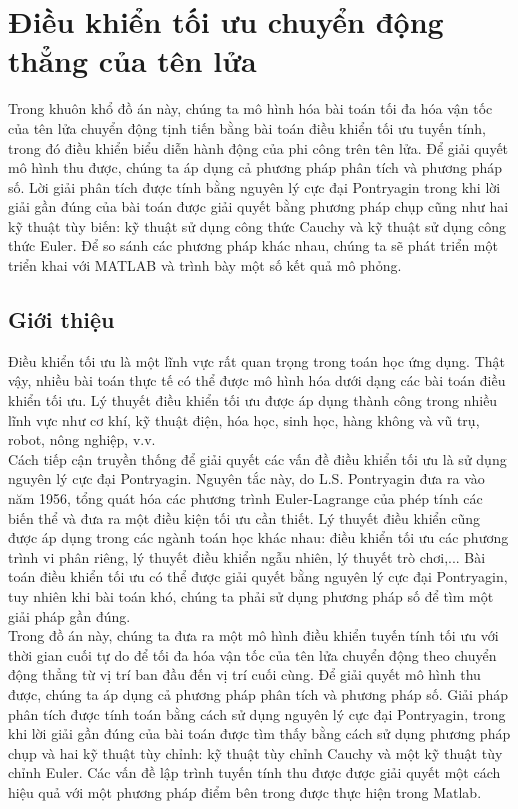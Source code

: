\documentclass[12pt,a4paper]{report}
\begin{document}
	\chapter{Điều khiển tối ưu chuyển động thẳng của tên lửa}
	
	Trong khuôn khổ đồ án này, chúng ta mô hình hóa bài toán tối đa hóa vận tốc của tên lửa chuyển động tịnh tiến bằng bài toán điều khiển tối ưu tuyến tính, trong đó điều khiển biểu diễn hành động của phi công trên tên lửa. Để giải quyết mô hình thu được, chúng ta áp dụng cả phương pháp phân tích và phương pháp số. Lời giải phân tích được tính bằng nguyên lý cực đại Pontryagin trong khi lời giải gần đúng của bài toán được giải quyết bằng phương pháp chụp cũng như hai kỹ thuật tùy biến: kỹ thuật sử dụng công thức Cauchy và kỹ thuật sử dụng công thức Euler. Để so sánh các phương pháp khác nhau, chúng ta sẽ phát triển một triển khai với MATLAB và trình bày một số kết quả mô phỏng.
	
	\section{Giới thiệu}
	Điều khiển tối ưu là một lĩnh vực rất quan trọng trong toán học ứng dụng. Thật vậy, nhiều bài toán thực tế có thể được mô hình hóa dưới dạng các bài toán điều khiển tối ưu. Lý thuyết điều khiển tối ưu được áp dụng thành công trong nhiều lĩnh vực như cơ khí, kỹ thuật điện, hóa học, sinh học, hàng không và vũ trụ, robot, nông nghiệp, v.v.\\Cách tiếp cận truyền thống để giải quyết các vấn đề điều khiển tối ưu là sử dụng nguyên lý cực đại Pontryagin. Nguyên tắc này, do L.S. Pontryagin đưa ra vào năm 1956, tổng quát hóa các phương trình Euler-Lagrange của phép tính các biến thể và đưa ra một điều kiện tối ưu cần thiết. Lý thuyết điều khiển cũng được áp dụng trong các ngành toán học khác nhau: điều khiển tối ưu các phương trình vi phân riêng, lý thuyết điều khiển ngẫu nhiên, lý thuyết trò chơi,... Bài toán điều khiển tối ưu có thể được giải quyết bằng nguyên lý cực đại Pontryagin, tuy nhiên khi bài toán khó, chúng ta phải sử dụng phương pháp số để tìm một giải pháp gần đúng.
	\\Trong đồ án này, chúng ta đưa ra một mô hình điều khiển tuyến tính tối ưu với thời gian cuối tự do để tối đa hóa vận tốc của tên lửa chuyển động theo chuyển động thẳng từ vị trí ban đầu đến vị trí cuối cùng. Để giải quyết mô hình thu được, chúng ta áp dụng cả phương pháp phân tích và phương pháp số. Giải pháp phân tích được tính toán bằng cách sử dụng nguyên lý cực đại Pontryagin, trong khi lời giải gần đúng của bài toán được tìm thấy bằng cách sử dụng phương pháp chụp và hai kỹ thuật tùy chỉnh: kỹ thuật tùy chỉnh Cauchy và một kỹ thuật tùy chỉnh Euler. Các vấn đề lập trình tuyến tính thu được được giải quyết một cách hiệu quả với một phương pháp điểm bên trong được thực hiện trong Matlab.
\end{document}
